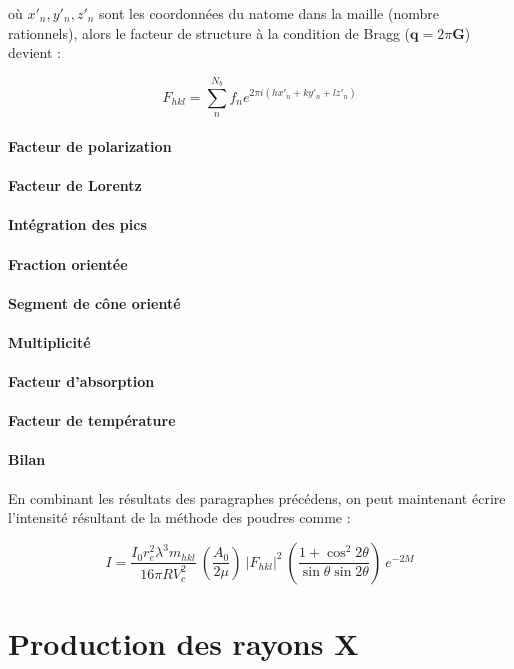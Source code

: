où $x'_n, y'_n, z'_n$ sont les coordonnées du n\ieme atome dans la maille (nombre rationnels), alors le facteur de structure à la condition de Bragg ($\mathbf{q} = 2\pi \mathbf{G}$) devient :

\begin{equation}
    F_{hkl} = \sum_n^{N_b} f_n e^{2\pi i (h x'_n + k y'_n + l z'_n)}
\end{equation}

\paragraph{Facteur de polarization}

\paragraph{Facteur de Lorentz}

\paragraph{Intégration des pics}

\paragraph{Fraction orientée}

\paragraph{Segment de cône orienté}

\paragraph{Multiplicité}

\paragraph{Facteur d'absorption}

\paragraph{Facteur de température}

\paragraph{Bilan}

En combinant les résultats des paragraphes précédens, on peut maintenant écrire l'intensité résultant de la méthode des poudres comme :

\begin{equation}
    I = 
        \frac{I_0 r_e^2 \lambda^3 m_{hkl}}{16\pi R V_c^2}\ 
        \left(\frac{A_0}{2\mu} \right) \
        |F_{hkl}|^2 \ 
        \left( \frac{1+\cos^2 2\theta}{\sin\theta \sin 2\theta} \right)\ 
        e^{-2M}
\end{equation}

\section{Production des rayons X}

